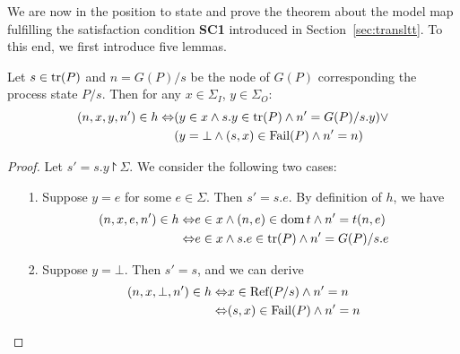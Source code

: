 We are now in the position to state and prove the theorem about the model map
fulfilling the satisfaction condition {\bf SC1} introduced in Section~\ref{sec:transltt}. To this end, we first introduce five lemmas.


\begin{lemma}\label{tran}
Let $s\in \text{tr}(P)$ and $n=G(P)/s$ be the node of $G(P)$ corresponding the process state $P/s$.
Then for any $x\in \Sigma_I$, $y\in \Sigma_O\colon$
\begin{align*}(n,x,y,n')\in h\Leftrightarrow &(y\in x\wedge s.y\in \text{tr}(P)\wedge n'=G(P)/s.y)\vee\\ &(y=\bot \wedge (s,x)\in {\text {\rm Fail}}(P)\wedge n'=n)\end{align*}
\end{lemma}

\begin{proof}
Let $s'=s.y\project \Sigma$.
We consider the following two cases:
\begin{itemize}
\item[1.] Suppose $y=e$ for some $e\in \Sigma$. Then $s'=s.e$. By definition of $h$, we have
\begin{align*}(n,x,e,n')\in h\Leftrightarrow & e\in x\wedge (n,e)\in {\text{\rm dom}}\, t\wedge n'=t(n,e)\\ \Leftrightarrow& e\in x\wedge s.e\in \text{tr}(P)\wedge n'=G(P)/s.e\end{align*}
\item[2.] Suppose $y=\bot$. Then $s'=s$, and we can derive
\begin{align*}(n,x,\bot,n')\in h\Leftrightarrow & x \in {\text {\rm Ref}}(P/s)\wedge n'=n \\
\Leftrightarrow & (s,x) \in {\text {\rm Fail}}(P)\wedge n'=n\end{align*}
\end{itemize}
\end{proof}


